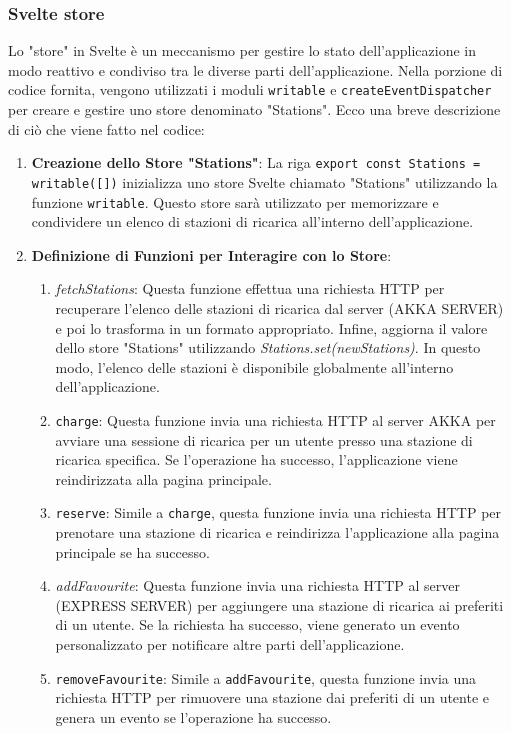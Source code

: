 \subsubsection{Svelte store}
Lo "store" in Svelte è un meccanismo per gestire lo stato dell'applicazione in modo reattivo e condiviso tra le diverse parti dell'applicazione. Nella porzione di codice fornita, vengono utilizzati i moduli \texttt{writable} e \texttt{createEventDispatcher} per creare e gestire uno store denominato "Stations". Ecco una breve descrizione di ciò che viene fatto nel codice:
\begin{enumerate}[label=\arabic*.]
    \item \textbf{Creazione dello Store "Stations"}: La riga
          \texttt{export const Stations = writable([])} inizializza uno store
          Svelte chiamato "Stations" utilizzando la funzione \texttt{writable}.
          Questo store sarà utilizzato per memorizzare e condividere un elenco
          di stazioni di ricarica all'interno dell'applicazione.

    \item \textbf{Definizione di Funzioni per Interagire con lo Store}:
          \begin{enumerate}[label=\arabic{enumi}.\arabic*]
              \item \textit{fetchStations}: Questa funzione effettua una richiesta
                    HTTP per recuperare l'elenco delle stazioni di ricarica dal server (AKKA SERVER)
                    e poi lo trasforma in un formato appropriato. Infine, aggiorna il valore dello
                    store "Stations" utilizzando \textit{Stations.set(newStations)}. In questo modo,
                    l'elenco delle stazioni è disponibile globalmente all'interno dell'applicazione.

              \item \texttt{charge}: Questa funzione invia una richiesta HTTP al server AKKA per avviare una sessione di ricarica per un utente presso una stazione di ricarica specifica. Se l'operazione ha successo, l'applicazione viene reindirizzata alla pagina principale.

              \item \texttt{reserve}: Simile a \texttt{charge}, questa funzione invia una richiesta HTTP per prenotare una stazione di ricarica e reindirizza l'applicazione alla pagina principale se ha successo.
              \item \textit{addFavourite}: Questa funzione invia una
                    richiesta HTTP al server (EXPRESS SERVER) per aggiungere una stazione
                    di ricarica ai preferiti di un utente. Se la richiesta ha successo, viene
                    generato un evento personalizzato per notificare altre parti dell'applicazione.

              \item \texttt{removeFavourite}: Simile a \texttt{addFavourite}, questa funzione invia una richiesta HTTP per rimuovere una stazione dai preferiti di un utente e genera un evento se l'operazione ha successo.
          \end{enumerate}
\end{enumerate}


